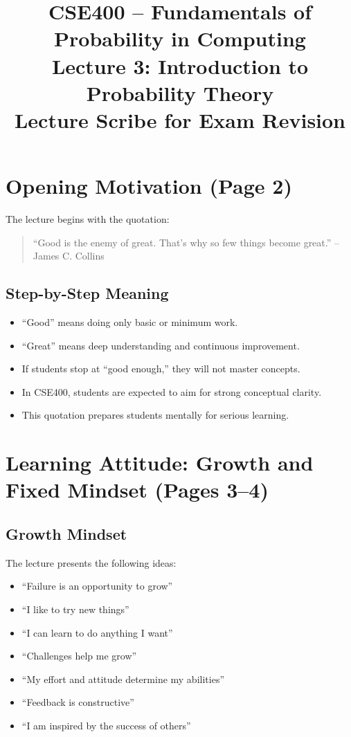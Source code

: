 \documentclass[12pt]{article}
\begin{document}
\title{CSE400 -- Fundamentals of Probability in Computing\\
Lecture 3: Introduction to Probability Theory\\
Lecture Scribe for Exam Revision}
\author{}
\date{}
\maketitle

\section{Opening Motivation (Page 2)}

The lecture begins with the quotation:

\begin{quote}
``Good is the enemy of great. That’s why so few things become great.'' -- James C. Collins
\end{quote}

\subsection*{Step-by-Step Meaning}

\begin{itemize}
\item ``Good'' means doing only basic or minimum work.
\item ``Great'' means deep understanding and continuous improvement.
\item If students stop at ``good enough,'' they will not master concepts.
\item In CSE400, students are expected to aim for strong conceptual clarity.
\item This quotation prepares students mentally for serious learning.
\end{itemize}

\section{Learning Attitude: Growth and Fixed Mindset (Pages 3--4)}

\subsection{Growth Mindset}

The lecture presents the following ideas:

\begin{itemize}
\item ``Failure is an opportunity to grow''
\item ``I like to try new things''
\item ``I can learn to do anything I want''
\item ``Challenges help me grow''
\item ``My effort and attitude determine my abilities''
\item ``Feedback is constructive''
\item ``I am inspired by the success of others''
\end{itemize}
\end{document}
